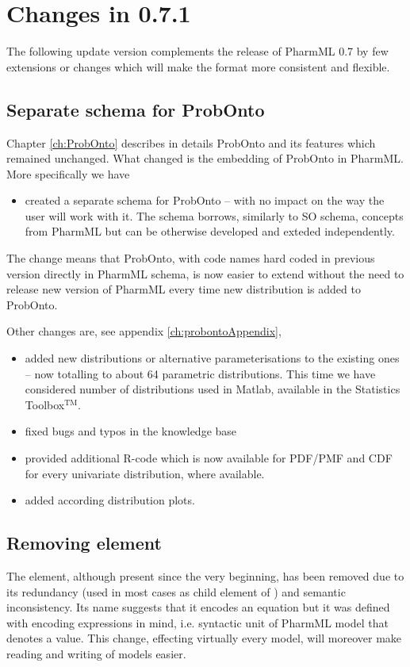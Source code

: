 
\chapter{Changes in 0.7.1}
\label{ch:071changes}
The following update version complements the release of PharmML 0.7 by
few extensions or changes which will make the format more consistent 
and flexible. 

\section{Separate schema for ProbOnto}
Chapter \ref{ch:ProbOnto} describes in details ProbOnto and its features 
which remained unchanged. What changed is the embedding of ProbOnto
in PharmML. More specifically we have 
\begin{itemize}
\item 
created a separate schema for ProbOnto -- with no impact on the way
the user will work with it. The schema borrows, similarly to SO schema, concepts
from PharmML but can be otherwise developed and exteded independently.
\end{itemize}
The change means that ProbOnto, with code names hard coded in previous 
version directly in PharmML schema, is now easier to extend without the need to 
release new version of PharmML every time new distribution is added 
to ProbOnto. 

Other changes are, see appendix \ref{ch:probontoAppendix},
\begin{itemize}
\item 
added new distributions or alternative parameterisations to the existing ones -- now 
totalling to about 64 parametric distributions. This time we have considered number of
distributions used in Matlab, available in the Statistics Toolbox$^{\text{TM}}$.
\item 
fixed bugs and typos in the knowledge base
\item 
provided additional R-code which is now available for PDF/PMF and CDF for every 
univariate distribution, where available.
\item 
added according distribution plots.
\end{itemize}


\section{Removing  element}

The  element, although present since the very beginning, 
has been removed due to its redundancy (used in most cases as child 
element of ) and semantic inconsistency. Its name suggests 
that it encodes an equation but it was defined with encoding expressions in mind, 
i.e. syntactic unit of PharmML model that denotes a value. This change, 
effecting virtually every model, will moreover make reading and writing of 
models easier.

